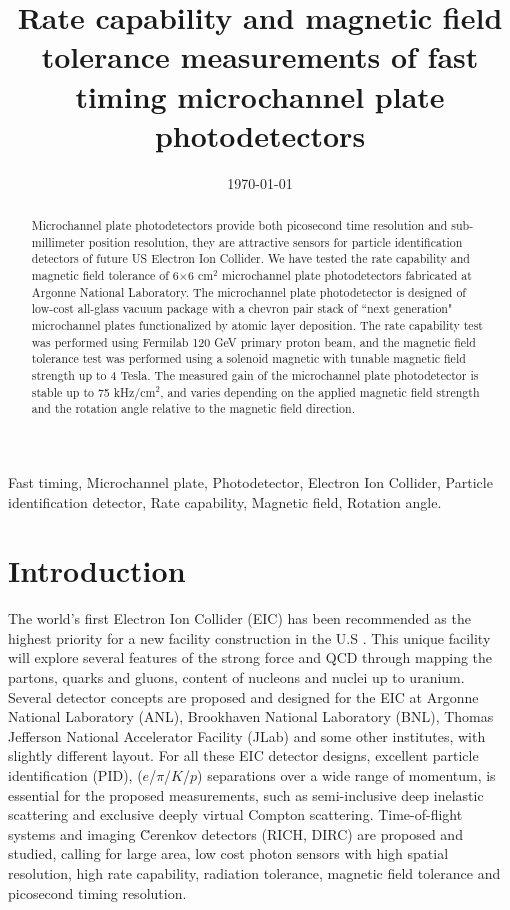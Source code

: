 \documentclass[preprint,5p]{elsarticle}
\title{\vspace{-15mm}\fontsize{18pt}{10pt}\selectfont\textbf{Rate capability 
and magnetic field tolerance measurements of fast timing microchannel plate 
photodetectors}}
\date{\today}
\begin{document}
\begin{abstract}
Microchannel plate photodetectors provide both picosecond time resolution and 
sub-millimeter position resolution, they are attractive sensors for particle 
identification detectors of future US Electron Ion Collider. We have tested the 
rate capability and magnetic field tolerance of 6$\times$6 cm$^{2}$ 
microchannel plate photodetectors fabricated at Argonne National Laboratory.  
The microchannel plate photodetector is designed of low-cost all-glass vacuum 
package with a chevron pair stack of ``next generation" microchannel plates 
functionalized by atomic layer deposition. The rate capability test was 
performed using Fermilab 120 GeV primary proton beam, and the magnetic field 
tolerance test was performed using a solenoid magnetic with tunable magnetic 
field strength up to 4 Tesla. The measured gain of the microchannel plate 
photodetector is stable up to 75 kHz/cm$^{2}$, and varies depending on the 
applied magnetic field strength and the rotation angle relative to the magnetic 
field direction.
\end{abstract}

\maketitle

\begin{keywords}
   Fast timing, Microchannel plate, Photodetector, Electron Ion Collider, 
   Particle identification detector, Rate capability, Magnetic field, Rotation 
   angle.
\end{keywords}


\section{Introduction} \label{sec:level1}
The world's first Electron Ion Collider (EIC) \cite{EIC} has been recommended 
as the highest priority for a new facility construction in the U.S \cite{LRP}.  
This unique facility will explore several features of the strong force and QCD 
through mapping the partons, quarks and gluons, content of nucleons and nuclei 
up to uranium. Several detector concepts are proposed and designed for the EIC 
at Argonne National Laboratory (ANL), Brookhaven National Laboratory (BNL), 
Thomas Jefferson National Accelerator Facility (JLab) and some other 
institutes, with slightly different layout. For all these EIC detector designs, 
excellent particle identification (PID), ($e$/$\pi$/$K$/$p$) separations over a 
wide range of momentum, is essential for the proposed measurements, such as 
semi-inclusive deep inelastic scattering and exclusive deeply virtual Compton 
scattering. Time-of-flight systems and imaging \u Cerenkov detectors (RICH, 
DIRC) \cite{RICH,RICH2,DRIC} are proposed and studied, calling for large area, 
low cost photon sensors with high spatial resolution, high rate capability, 
radiation tolerance, magnetic field tolerance and picosecond timing resolution. 
\end{document}

